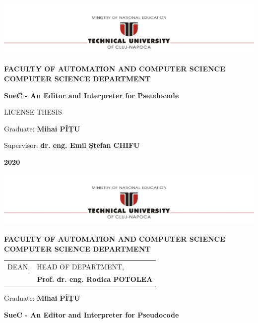 \documentclass[12pt,a4paper,twoside]{report}
\renewcommand{\thesisauthor}{Mihai PÎȚU}    %
\renewcommand{\thesisyear}{2020}      %
\renewcommand{\thesistitle}{SueC - An Editor and Interpreter for Pseudocode}
\renewcommand{\thesissupervisor}{dr. eng. Emil Ștefan CHIFU}
\newcommand{\department}{\bf FACULTY OF AUTOMATION AND COMPUTER SCIENCE\\
COMPUTER SCIENCE DEPARTMENT}
\newcommand{\utcnlogo}{\includegraphics[width=15cm]{img/tucn.jpg}}
\begin{document}

\newenvironment{definition}[1][Defini\c{t}ie.]{\begin{trivlist}
\item[\hskip \labelsep {\bfseries #1}]}{\end{trivlist}}





\begin{center}
\utcnlogo

\department

\vspace{4cm}

{\bf \thesistitle} %

\vspace{1.5cm}

LICENSE THESIS

\vspace{6cm}

Graduate: {\bf \thesisauthor} 

Supervisor: {\bf \thesissupervisor}

\vspace{3cm}
{\bf \thesisyear}
\end{center}

\thispagestyle{empty}
\newpage

\begin{center}
\utcnlogo

\department

\end{center}
\vspace{0.5cm}

\begin{tabular}{p{7cm}p{8cm}}
 \hspace{-1cm}DEAN, & HEAD OF DEPARTMENT,\\
 \hspace{-1cm}{\bf Prof. dr. eng. Liviu MICLEA} & {\bf Prof. dr. eng. Rodica POTOLEA}\\  
\end{tabular}
 
\vspace{2cm}

\begin{center}
Graduate: {\bf \thesisauthor}

\vspace{1cm}

{\bf \thesistitle}
\end{center}
\end{document}
